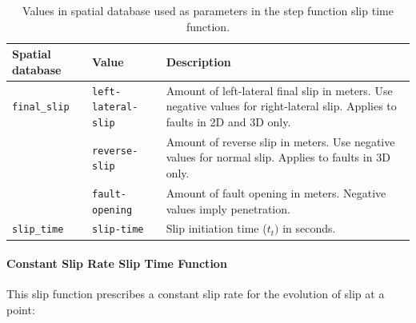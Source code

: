 \noindent \begin{center}
\begin{table}[H]
\noindent \centering{}\caption{\label{tab:step-function-db-params}Values in spatial database used
as parameters in the step function slip time function.}
\medskip{}
\begin{tabular}{|l|l|>{\raggedright}p{2.5in}|}
\hline 
\textbf{Spatial database} & \textbf{Value} & \textbf{Description}\tabularnewline
\hline 
\hline 
\texttt{final\_slip} & \texttt{left-lateral-slip} & Amount of left-lateral final slip in meters. Use negative values for
right-lateral slip. Applies to faults in 2D and 3D only.\tabularnewline
 & \texttt{reverse-slip} & Amount of reverse slip in meters. Use negative values for normal slip.
Applies to faults in 3D only.\tabularnewline
 & \texttt{fault-opening} & Amount of fault opening in meters. Negative values imply penetration.\tabularnewline
\hline 
\texttt{slip\_time} & \texttt{slip-time} & Slip initiation time ($t_{t})$ in seconds.\tabularnewline
\hline 
\end{tabular}
\end{table}

\par\end{center}


\paragraph{Constant Slip Rate Slip Time Function}

This slip function prescribes a constant slip rate for the evolution
of slip at a point: 

